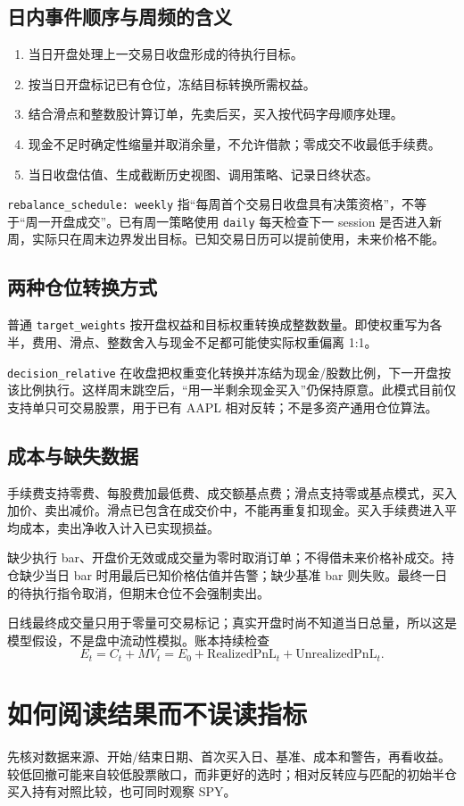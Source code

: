 \documentclass[UTF8,fontset=none,11pt]{ctexart}
\newcommand{\code}[1]{\nolinkurl{#1}}
\let\originalsection\section
\renewcommand{\section}{\Needspace{9\baselineskip}\originalsection}
\let\originalsubsection\subsection
\renewcommand{\subsection}{\Needspace{8\baselineskip}\originalsubsection}
\begin{document}
\subsection{日内事件顺序与周频的含义}
\begin{enumerate}
\item 当日开盘处理上一交易日收盘形成的待执行目标。
\item 按当日开盘标记已有仓位，冻结目标转换所需权益。
\item 结合滑点和整数股计算订单，先卖后买，买入按代码字母顺序处理。
\item 现金不足时确定性缩量并取消余量，不允许借款；零成交不收最低手续费。
\item 当日收盘估值、生成截断历史视图、调用策略、记录日终状态。
\end{enumerate}
\code{rebalance_schedule: weekly} 指“每周首个交易日收盘具有决策资格”，不等于“周一开盘成交”。已有周一策略使用 \code{daily} 每天检查下一 session 是否进入新周，实际只在周末边界发出目标。已知交易日历可以提前使用，未来价格不能。

\subsection{两种仓位转换方式}
普通 \code{target_weights} 按开盘权益和目标权重转换成整数数量。即使权重写为各半，费用、滑点、整数舍入与现金不足都可能使实际权重偏离 1:1。

\code{decision_relative} 在收盘把权重变化转换并冻结为现金/股数比例，下一开盘按该比例执行。这样周末跳空后，“用一半剩余现金买入”仍保持原意。此模式目前仅支持单只可交易股票，用于已有 AAPL 相对反转；不是多资产通用仓位算法。

\subsection{成本与缺失数据}
手续费支持零费、每股费加最低费、成交额基点费；滑点支持零或基点模式，买入加价、卖出减价。滑点已包含在成交价中，不能再重复扣现金。买入手续费进入平均成本，卖出净收入计入已实现损益。

缺少执行 bar、开盘价无效或成交量为零时取消订单；不得借未来价格补成交。持仓缺少当日 bar 时用最后已知价格估值并告警；缺少基准 bar 则失败。最终一日的待执行指令取消，但期末仓位不会强制卖出。

日线最终成交量只用于零量可交易标记；真实开盘时尚不知道当日总量，所以这是模型假设，不是盘中流动性模拟。账本持续检查
\[
E_t=C_t+MV_t=E_0+\mathrm{RealizedPnL}_t+\mathrm{UnrealizedPnL}_t.
\]

\section{如何阅读结果而不误读指标}
先核对数据来源、开始/结束日期、首次买入日、基准、成本和警告，再看收益。较低回撤可能来自较低股票敞口，而非更好的选时；相对反转应与匹配的初始半仓买入持有对照比较，也可同时观察 SPY。
\end{document}
